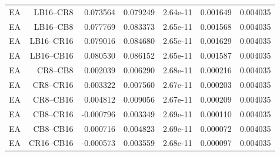 {\begin{longtable}{lrrrrrr}
EA & LB16--CR8 & 0.073564 & 0.079249 & 2.64e-11 & 0.001649 & 0.004035 \\
EA & LB16--CB8 & 0.077769 & 0.083373 & 2.65e-11 & 0.001568 & 0.004035 \\
EA & LB16--CR16 & 0.079016 & 0.084680 & 2.65e-11 & 0.001629 & 0.004035 \\
EA & LB16--CB16 & 0.080530 & 0.086152 & 2.65e-11 & 0.001587 & 0.004035 \\
EA & CR8--CB8 & 0.002039 & 0.006290 & 2.68e-11 & 0.000216 & 0.004035 \\
EA & CR8--CR16 & 0.003322 & 0.007560 & 2.67e-11 & 0.000203 & 0.004035 \\
EA & CR8--CB16 & 0.004812 & 0.009056 & 2.67e-11 & 0.000209 & 0.004035 \\
EA & CB8--CR16 & -0.000796 & 0.003349 & 2.69e-11 & 0.000110 & 0.004035 \\
EA & CB8--CB16 & 0.000716 & 0.004823 & 2.69e-11 & 0.000072 & 0.004035 \\
EA & CR16--CB16 & -0.000573 & 0.003559 & 2.68e-11 & 0.000097 & 0.004035 \\
\hline
\end{longtable}}
